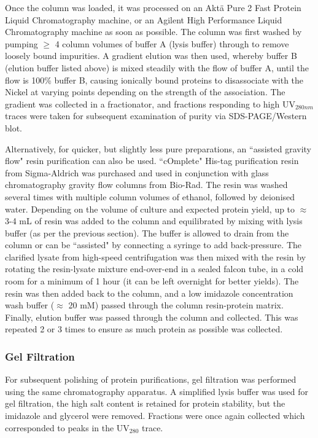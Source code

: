 Once the column was loaded, it was processed on an Akt{\"a} Pure 2 Fast Protein Liquid Chromatography machine, or an Agilent High Performance Liquid Chromatography machine as soon as possible. The column was first washed by pumping $\geq$ 4 column volumes of buffer A (lysis buffer) through to remove loosely bound impurities. A gradient elution was then used, whereby buffer B (elution buffer listed above) is mixed steadily with the flow of buffer A, until the flow is 100\% buffer B, causing ionically bound proteins to disassociate with the Nickel at varying points depending on the strength of the association. The gradient was collected in a fractionator, and fractions responding to high UV$_{280nm}$ traces were taken for subsequent examination of purity via SDS-PAGE/Western blot.

Alternatively, for quicker, but slightly less pure preparations, an ``assisted gravity flow" resin purification can also be used. ``cOmplete" His-tag purification resin from Sigma-Aldrich was purchased and used in conjunction with glass chromatography gravity flow columns from Bio-Rad. The resin was washed several times with multiple column volumes of ethanol, followed by deionised water. Depending on the volume of culture and expected protein yield, up to $\approx$ 3-4 mL of resin was added to the column and equilibrated by mixing with lysis buffer (as per the previous section). The buffer is allowed to drain from the column or can be ``assisted" by connecting a syringe to add back-pressure. The clarified lysate from high-speed centrifugation was then mixed with the resin by rotating the resin-lysate mixture end-over-end in a sealed falcon tube, in a cold room for a minimum of 1 hour (it can be left overnight for better yields). The resin was then added back to the column, and a low imidazole concentration wash buffer ($\approx$ 20 mM) passed through the column resin-protein matrix. Finally, elution buffer was passed through the column and collected. This was repeated 2 or 3 times to ensure as much protein as possible was collected.

\subsubsection{Gel Filtration}
For subsequent polishing of protein purifications, gel filtration was performed using the same chromatography apparatus. A simplified lysis buffer was used for gel filtration, the high salt content is retained for protein stability, but the imidazole and glycerol were removed. Fractions were once again collected which corresponded to peaks in the UV$_{280}$ trace.
	
